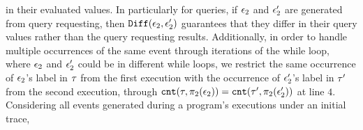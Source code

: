 in their evaluated values.
In particularly for queries, if $\mathtt{\epsilon}_2$ and $\mathtt{\epsilon}_2'$ are 
generated from query requesting, then $\mathtt{Diff}(\mathtt{\epsilon}_2, \mathtt{\epsilon}_2')$ guarantees that
they differ in their query values rather than the 
query requesting results. 
Additionally, in order to handle multiple occurrences of the same event through iterations of the while loop,
 where  $\mathtt{\epsilon}_2$ and $\mathtt{\epsilon}_2'$ could be 
in different while loops,
we restrict the same occurrence of $\mathtt{\epsilon}_2$'s label in $\mathtt{\tau}$ from the first execution with  the occurrence of $\mathtt{\epsilon}_2'$'s label in $\mathtt{\tau}'$ from the second execution,
through $\mathtt{cnt}(\mathtt{\tau}, \pi_2(\mathtt{\epsilon}_2))
= 
\mathtt{cnt}(\mathtt{\tau}', \pi_2(\mathtt{\epsilon}_2'))$ at line $4$.
%
%
Considering 
all events generated during a program's executions
under an initial trace,

